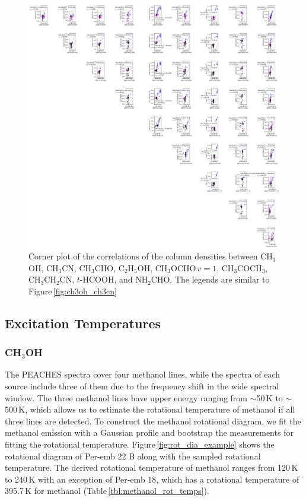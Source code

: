 \documentclass[twocolumn]{aastex62}
\newcommand{\methylformatev}{\mbox{CH$_{3}$OCHO\,$v=1$}}
\newcommand{\methanol}{\mbox{CH$_{3}$OH}}
\newcommand{\acetone}{\mbox{CH$_{3}$COCH$_{3}$}}
\newcommand{\ethanol}{\mbox{C$_{2}$H$_{5}$OH}}
\newcommand{\acetaldehyde}{\mbox{CH$_{3}$CHO}}
\newcommand{\ethylcyanide}{\mbox{CH$_{3}$CH$_{2}$CN}}
\newcommand{\methylcyanide}{\mbox{CH$_{3}$CN}}
\newcommand{\formamide}{\mbox{NH$_{2}$CHO}}
\begin{document}
\begin{figure}[htbp!]
  \centering
  \includegraphics[width=\textwidth]{corner_Ncol_correlations_minor.pdf}
  \caption{Corner plot of the correlations of the column densities between \methanol, \methylcyanide, \acetaldehyde, \ethanol, \methylformatev, \acetone, \ethylcyanide, $t$-HCOOH, and \formamide.  The legends are similar to Figure\,\ref{fig:ch3oh_ch3cn}}
  \label{fig:corner_minor}
\end{figure}

\subsection{Excitation Temperatures}
\subsubsection{\methanol}
The PEACHES spectra cover four methanol lines, while the spectra of each source include three of them due to the frequency shift in the wide spectral window.  The three methanol lines have upper energy ranging from $\sim$50\,K to $\sim$500\,K, which allows us to estimate the rotational temperature of methanol if all three lines are detected.  To construct the methanol rotational diagram, we fit the methanol emission with a Gaussian profile and bootstrap the measurements for fitting the rotational temperature.  Figure\,\ref{fig:rot_dia_example} shows the rotational diagram of Per-emb 22 B along with the sampled rotational temperature.  The derived rotational temperature of methanol ranges from 120\,K to 240\,K with an exception of Per-emb 18, which has a rotational temperature of 395.7\,K for methanol (Table\,\ref{tbl:methanol_rot_temps}).
\end{document}
